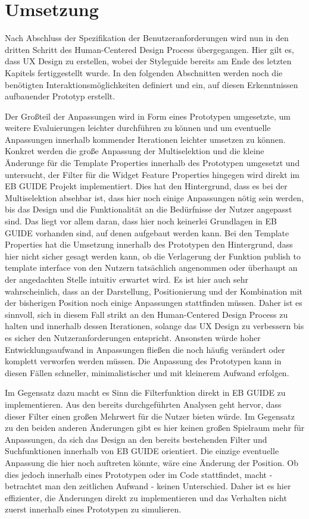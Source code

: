 \chapter{Umsetzung}\label{ch:experiments}

Nach Abschluss der Spezifikation der Benutzeranforderungen wird nun in den dritten Schritt des Human-Centered Design Process übergegangen.
Hier gilt es, dass UX Design zu erstellen, wobei der Styleguide bereits am Ende des letzten Kapitels fertiggestellt wurde.
In den folgenden Abschnitten werden noch die benötigten Interaktionsmöglichkeiten definiert und ein, auf diesen Erkenntnissen aufbauender Prototyp erstellt.

Der Großteil der Anpassungen wird in Form eines Prototypen umgesetzte, um weitere Evaluierungen leichter durchführen zu können und um eventuelle Anpassungen innerhalb kommender Iterationen leichter umsetzen zu können.
Konkret werden die große Anpassung der Multiselektion und die kleine Änderunge für die Template Properties innerhalb des Prototypen umgesetzt und untersucht, der Filter für die Widget Feature Properties hingegen wird direkt im EB GUIDE Projekt implementiert.
Dies hat den Hintergrund, dass es bei der Multiselektion absehbar ist, dass hier noch einige Anpassungen nötig sein werden, bis das Design und die Funktionalität an die Bedürfnisse der Nutzer angepasst sind.
Das liegt vor allem daran, dass hier noch keinerlei Grundlagen in EB GUIDE vorhanden sind, auf denen aufgebaut werden kann.
Bei den Template Properties hat die Umsetzung innerhalb des Prototypen den Hintergrund, dass hier nicht sicher gesagt werden kann, ob die Verlagerung der Funktion \glqq publish to template interface\grqq{} von den Nutzern tatsächlich angenommen oder überhaupt an der angedachten Stelle intuitiv erwartet wird.
Es ist hier auch sehr wahrscheinlich, dass an der Darstellung, Positionierung und der Kombination mit der bisherigen Position noch einige Anpassungen stattfinden müssen.
Daher ist es sinnvoll, sich in diesem Fall strikt an den Human-Centered Design Process zu halten und innerhalb dessen Iterationen, solange das UX Design zu verbessern bis es sicher den Nutzeranforderungen entspricht.
Ansonsten würde hoher Entwicklungsaufwand in Anpassungen fließen die noch häufig verändert oder komplett verworfen werden müssen.
Die Anpassung des Prototypen kann in diesen Fällen schneller, minimalistischer und mit kleinerem Aufwand erfolgen.

Im Gegensatz dazu macht es Sinn die Filterfunktion direkt in EB GUIDE zu implementieren.
Aus den bereits durchgeführten Analysen geht hervor, dass dieser Filter einen großen Mehrwert für die Nutzer bieten würde.
Im Gegensatz zu den beiden anderen Änderungen gibt es hier keinen großen Spielraum mehr für Anpassungen, da sich das Design an den bereits bestehenden Filter und Suchfunktionen innerhalb von EB GUIDE orientiert.
Die einzige eventuelle Anpassung die hier noch auftreten könnte, wäre eine Änderung der Position.
Ob dies jedoch innerhalb eines Prototypen oder im Code stattfindet, macht - betrachtet man den zeitlichen Aufwand - keinen Unterschied.
Daher ist es hier effizienter, die Änderungen direkt zu implementieren und das Verhalten nicht zuerst innerhalb eines Prototypen zu simulieren.

